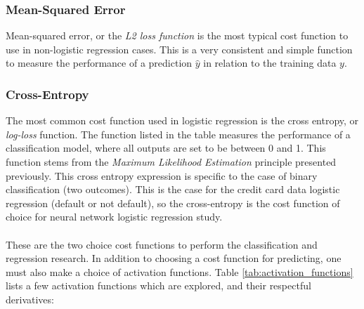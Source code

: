         \subsubsection{Mean-Squared Error}
            Mean-squared error, or the \textit{L2 loss function} is the most typical cost function to use in non-logistic regression cases. This is a very consistent and simple function to measure the performance of a prediction $\hat{y}$ in relation to the training data $y$.
        \subsubsection{Cross-Entropy}
            The most common cost function used in logistic regression is the cross entropy, or \textit{log-loss} function. The function listed in the table measures the performance of a classification model, where all outputs are set to be between 0 and 1. This function stems from the \textit{Maximum Likelihood Estimation} principle presented previously.
            This cross entropy expression is specific to the case of binary classification (two outcomes). This is the case for the credit card data logistic regression (default or not default), so the cross-entropy is the cost function of choice for neural network logistic regression study. \\\\
        These are the two choice cost functions to perform the classification and regression research. In addition to choosing a cost function for predicting, one must also make a choice of activation functions. Table \ref{tab:activation_functions} lists a few activation functions which are explored, and their respectful derivatives:
